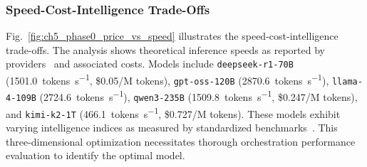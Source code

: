 {\begin{table}
    \centering
    \caption{Five open-source \ac{LLM} candidates with parameters ranging from 70B to 1T (32B-235B active), context windows of 128K-1M+ tokens, spanning \ac{MoE} Transformer and Dense Transformer architectures (Q4 2024-Q2 2025 releases), all supporting function calling, mathematical reasoning, and code generation}
    \label{tab:ch5_model_comparison}
    \small
    \renewcommand{\arraystretch}{1.3}
\end{table}


\subsubsection{Speed-Cost-Intelligence Trade-Offs}

Fig.~\ref{fig:ch5_phase0_price_vs_speed} illustrates the speed-cost-intelligence trade-offs. The analysis shows theoretical inference speeds as reported by providers~\cite{artificialanalysis_leaderboard} and associated costs. Models include \texttt{deepseek-r1-70B} (\SI{1501.0}{tokens\per\second}, \$0.05/M tokens), \texttt{gpt-oss-120B} (\SI{2870.6}{tokens\per\second}), \texttt{llama-4-109B} (\SI{2724.6}{tokens\per\second}), \texttt{qwen3-235B} (\SI{1509.8}{tokens\per\second}, \$0.247/M tokens), and \texttt{kimi-k2-1T} (\SI{466.1}{tokens\per\second}, \$0.727/M tokens). These models exhibit varying intelligence indices as measured by standardized benchmarks~\cite{artificialanalysis_leaderboard}. This three-dimensional optimization necessitates thorough orchestration performance evaluation to identify the optimal model.

}
